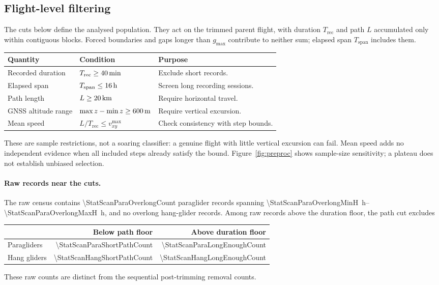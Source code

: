 \subsection{Flight-level filtering}
\label{sec:flightfilter}
\begin{revblock}
The cuts below define the analysed population. They act on the trimmed parent
flight, with duration $T_{\mathrm{rec}}$ and path $L$ accumulated only within
contiguous blocks. Forced boundaries and gaps longer than $g_{\max}$ contribute
to neither sum; elapsed span $T_{\mathrm{span}}$ includes them.
\begin{center}
\begin{tabularx}{\linewidth}{@{}l l X@{}}
\toprule
\textbf{Quantity} & \textbf{Condition} & \textbf{Purpose} \\
\midrule
Recorded duration & $T_{\mathrm{rec}}\ge\SI{40}{\minute}$ & Exclude short records. \\
Elapsed span & $T_{\mathrm{span}}\le\SI{16}{\hour}$ & Screen long recording sessions. \\
Path length & $L\ge\SI{20}{\kilo\metre}$ & Require horizontal travel. \\
GNSS altitude range & $\max z-\min z\ge\SI{600}{\metre}$ & Require vertical excursion. \\
Mean speed & $L/T_{\mathrm{rec}}\le v_{xy}^{\max}$ & Check consistency with step bounds. \\
\bottomrule
\end{tabularx}
\end{center}
These are sample restrictions, not a soaring classifier: a genuine flight with
little vertical excursion can fail. Mean speed adds no independent evidence when
all included steps already satisfy the bound. Figure~\ref{fig:preproc} shows
sample-size sensitivity; a plateau does not establish unbiased selection.

\paragraph{Raw records near the cuts.}
The raw census contains \num{\StatScanParaOverlongCount} paraglider records spanning
\SIrange{\StatScanParaOverlongMinH}{\StatScanParaOverlongMaxH}{\hour},
and no overlong hang-glider records. Among raw records above the duration floor,
the path cut excludes
\begin{center}
\begin{tabular}{@{}lrr@{}}
\toprule
 & \textbf{Below path floor} & \textbf{Above duration floor} \\
\midrule
Paragliders & \num{\StatScanParaShortPathCount} & \num{\StatScanParaLongEnoughCount} \\
Hang gliders & \num{\StatScanHangShortPathCount} & \num{\StatScanHangLongEnoughCount} \\
\bottomrule
\end{tabular}
\end{center}
These raw counts are distinct from the sequential post-trimming removal counts.


\end{revblock}
